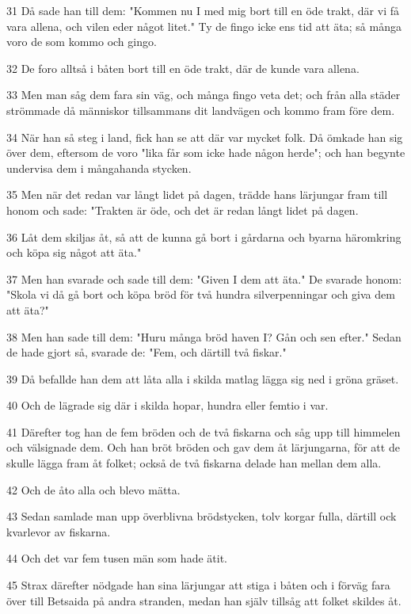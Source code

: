 \par 31 Då sade han till dem: "Kommen nu I med mig bort till en öde trakt, där vi få vara allena, och vilen eder något litet." Ty de fingo icke ens tid att äta; så många voro de som kommo och gingo.
\par 32 De foro alltså i båten bort till en öde trakt, där de kunde vara allena.
\par 33 Men man såg dem fara sin väg, och många fingo veta det; och från alla städer strömmade då människor tillsammans dit landvägen och kommo fram före dem.
\par 34 När han så steg i land, fick han se att där var mycket folk. Då ömkade han sig över dem, eftersom de voro "lika får som icke hade någon herde"; och han begynte undervisa dem i mångahanda stycken.
\par 35 Men när det redan var långt lidet på dagen, trädde hans lärjungar fram till honom och sade: "Trakten är öde, och det är redan långt lidet på dagen.
\par 36 Låt dem skiljas åt, så att de kunna gå bort i gårdarna och byarna häromkring och köpa sig något att äta."
\par 37 Men han svarade och sade till dem: "Given I dem att äta." De svarade honom: "Skola vi då gå bort och köpa bröd för två hundra silverpenningar och giva dem att äta?"
\par 38 Men han sade till dem: "Huru många bröd haven I? Gån och sen efter." Sedan de hade gjort så, svarade de: "Fem, och därtill två fiskar."
\par 39 Då befallde han dem att låta alla i skilda matlag lägga sig ned i gröna gräset.
\par 40 Och de lägrade sig där i skilda hopar, hundra eller femtio i var.
\par 41 Därefter tog han de fem bröden och de två fiskarna och såg upp till himmelen och välsignade dem. Och han bröt bröden och gav dem åt lärjungarna, för att de skulle lägga fram åt folket; också de två fiskarna delade han mellan dem alla.
\par 42 Och de åto alla och blevo mätta.
\par 43 Sedan samlade man upp överblivna brödstycken, tolv korgar fulla, därtill ock kvarlevor av fiskarna.
\par 44 Och det var fem tusen män som hade ätit.
\par 45 Strax därefter nödgade han sina lärjungar att stiga i båten och i förväg fara över till Betsaida på andra stranden, medan han själv tillsåg att folket skildes åt.
